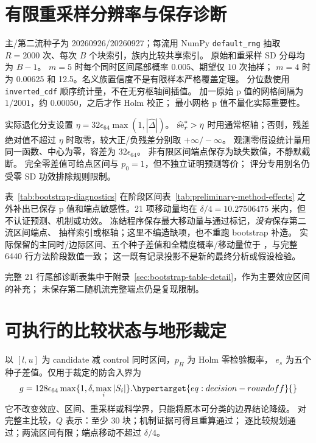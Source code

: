 \section{有限重采样分辨率与保存诊断}
\label{sec:bootstrap-resolution}\hypertarget{sec:bootstrap-resolution}{}
主/第二流种子为 20260926/20260927；每流用 NumPy \texttt{default\_rng}
抽取 \(R=2000\) 次、每次 \(B\) 个块索引，族内比较共享索引。
原始和重采样 SD 分母均为 \(B-1\)。
\(m=5\) 时每个同时区间尾部概率 0.005、期望仅 10 次抽样；
\(m=4\) 时为 0.00625 和 12.5。名义族置信度不是有限样本严格覆盖定理。
分位数使用 \texttt{inverted\_cdf} 顺序统计量，不在无穷枢轴间插值。
加一原始 p 值的网格间隔为 \(1/2001\)，约 0.00050，之后才作 Holm 校正；
最小网格 p 值不量化实际重要性。

实际退化分支设置 \(\eta=32\epsilon_{64}\max(1,|\widehat\Delta|)\)。
\(\widehat{\rm se}_r^*>\eta\) 时用通常枢轴；否则，残差绝对值不超过
\(\eta\) 时取零，较大正/负残差分别取 \(+\infty/-\infty\)。
观测零假设统计量用同一函数、中心为零，容差为 \(32\epsilon_{64}\)。
非有限区间端点保存为缺失数值，不静默截断。
完全零差值可给点区间与 \(p_0=1\)，但不独立证明预测等价；
评分专用别名仍受零 SD 功效排除规则限制。

表~\ref{tab:bootstrap-diagnostics} 在阶段区间表~\ref{tab:preliminary-method-effects}
之外补出已保存 p 值和端点敏感性。21 项移动量均在
\(\delta/4=10.27506475\) 米内，但不认证预测、机制或功效。
冻结程序保存最大移动量与通过标记，\emph{没有}保存第二流区间端点、
抽样索引或枢轴；这里不编造缺项，也不重跑 bootstrap 补造。
实际保留的主同时/边际区间、五个种子差值和全精度概率/移动量位于
，与完整 6440 行方法阶段数值一致；
这一既有记录投影不是新的最终分析或假设检验。

完整 21 行尾部诊断表集中于附录~\ref{sec:bootstrap-table-detail}，作为主要效应区间的补充；
未保存第二随机流完整端点仍是复现限制。


\section{可执行的比较状态与地形裁定}
\label{sec:decision-conditions}\hypertarget{sec:decision-conditions}{}
以 \([l,u]\) 为 candidate 减 control 同时区间，\(p_H\) 为 Holm 零检验概率，
\(e_s\) 为五个种子差值。仅用于裁定的防舍入界为
\begin{equation}
 g=128\epsilon_{64}\max\{1,\delta,\max_i|S_i|\}.
 \label{eq:decision-roundoff}\hypertarget{eq:decision-roundoff}{}
\end{equation}
它不改变效应、区间、重采样或科学界，只能将原本可分类的边界结论降级。
对完整主比较，\(Q\) 表示：至少 30 块；机制证据可得且重算通过；
逐比较规划通过；两流区间有限；端点移动不超过 \(\delta/4\)。

